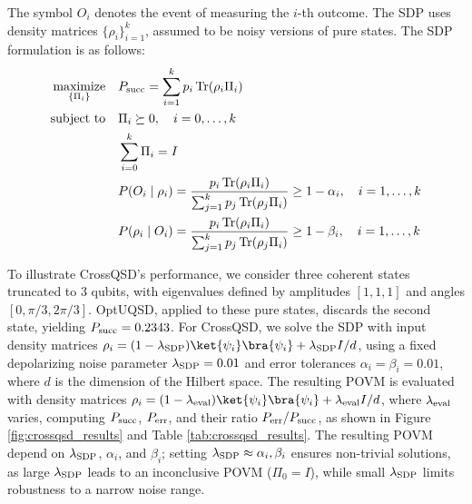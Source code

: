 The symbol \(O_i\) denotes the event of measuring the \(i\)-th outcome.
The SDP uses density matrices \(\{ \rho_i \}_{i=1}^k\), assumed to be noisy
versions of pure states.
The SDP formulation is as follows:
\begin{align}
    \underset{\{\Pi_i\}}{\text{maximize}} \quad & P_{\mathrm{succ}} = \sum_{i=1}^{k} p_i \operatorname{Tr}(\rho_i \Pi_i) \label{eq:crossqsd_obj}                                                                                                   \\
    \text{subject to} \quad                     & \Pi_i \succeq 0, \quad i = 0, \ldots, k \label{eq:crossqsd_psd}                                                                                                                       \\
                                                & \sum_{i=0}^{k} \Pi_i = I \label{eq:crossqsd_sum}                                                                                                                                      \\
                                                & P(O_i \mid \rho_i) = \frac{p_i \operatorname{Tr}(\rho_i \Pi_i)}{\sum_{j=1}^k p_j \operatorname{Tr}(\rho_j \Pi_i)} \geq 1 - \alpha_i, \quad i = 1, \ldots, k \label{eq:crossqsd_type1} \\
                                                & P(\rho_i \mid O_i) = \frac{p_i \operatorname{Tr}(\rho_i \Pi_i)}{\sum_{j=1}^k p_j \operatorname{Tr}(\rho_j \Pi_i)} \geq 1 - \beta_i, \quad i = 1, \ldots, k \label{eq:crossqsd_type2}
\end{align}

To illustrate CrossQSD’s performance, we consider three coherent states truncated to 3 qubits, with eigenvalues defined by amplitudes \([1, 1, 1]\) and angles \([0, \pi/3, 2\pi/3]\). OptUQSD, applied to these pure states, discards the second state, yielding \(P_{\mathrm{succ}} = 0.2343\). For CrossQSD, we solve the SDP with input density matrices \(\rho_i = (1-\lSDP)\ket{\psi_i}\bra{\psi_i} + \lSDP I/d\), using a fixed depolarizing noise parameter \(\lambda_{\mathrm{SDP}} = 0.01\) and error tolerances \(\alpha_i = \beta_i = 0.01\), where \(d\) is the dimension of the Hilbert space. The resulting POVM is evaluated with density matrices \(\rho_i = (1-\leval)\ket{\psi_i}\bra{\psi_i} + \leval I/d\), where \(\lambda_{\mathrm{eval}}\) varies, computing \(P_{\mathrm{succ}}\), \(P_{\mathrm{err}}\), and their ratio \(P_{\mathrm{err}} / P_{\mathrm{succ}}\), as shown in Figure \ref{fig:crossqsd_results} and Table \ref{tab:crossqsd_results}. The resulting POVM depend on \(\lambda_{\mathrm{SDP}}\), \(\alpha_i\), and \(\beta_i\); setting \(\lambda_{\mathrm{SDP}} \approx \alpha_i, \beta_i\) ensures non-trivial solutions, as large \(\lambda_{\mathrm{SDP}}\) leads to an inconclusive POVM (\(\Pi_0 = I\)), while small \(\lambda_{\mathrm{SDP}}\) limits robustness to a narrow noise range.

